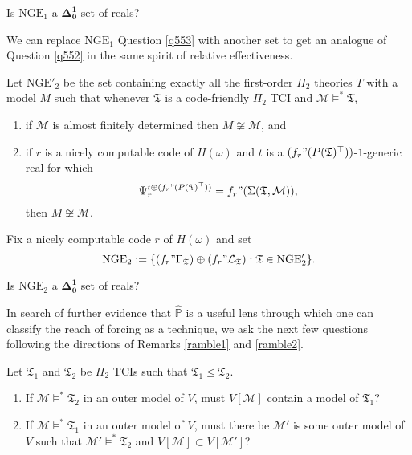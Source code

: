 \documentclass[12pt]{article}
\numberwithin{equation}{section}
\begin{document}
\begin{ques}\label{q553}
Is $\mathrm{NGE}_1$ a $\mathbf{\Delta^1_0}$ set of reals?
\end{ques}

We can replace $\mathrm{NGE}_1$ Question \ref{q553} with another set to get an analogue of Question \ref{q552} in the same spirit of relative effectiveness. 

Let $\mathrm{NGE}'_2$ be the set containing exactly all the first-order $\Pi_2$ theories $T$ with a model $M$ such that whenever $\mathfrak{T}$ is a code-friendly $\Pi_2$ TCI and $\mathcal{M} \models^* \mathfrak{T}$,
\begin{enumerate}[label=(\alph*)]
    \item if $\mathcal{M}$ is almost finitely determined then $M \not \cong \mathcal{M}$, and
    \item if $r$ is a nicely computable code of $H(\omega)$ and $t$ is a $(f_r" (P(\mathfrak{T})^{\top}))$-$1$-generic real for which
    \begin{equation*}
        \Psi_r^{t \oplus (f_r" (P(\mathfrak{T})^{\top}))} = f_r" (\Sigma(\mathfrak{T}, \mathcal{M})) \text{,}
    \end{equation*}
    then $M \not \cong \mathcal{M}$.
\end{enumerate}
Fix a nicely computable code $r$ of $H(\omega)$ and set
\begin{equation*}
    \mathrm{NGE}_2 := \{(f_r" \Gamma_{\mathfrak{T}}) \oplus (f_r" \mathcal{L}_{\mathfrak{T}}) : \mathfrak{T} \in \mathrm{NGE}'_2\} \text{.}
\end{equation*}

\begin{ques}
Is $\mathrm{NGE}_2$ a $\mathbf{\Delta^1_0}$ set of reals?
\end{ques}

In search of further evidence that $\hat{\mathbb{P}}$ is a useful lens through which one can classify the reach of forcing as a technique, we ask the next few questions following the directions of Remarks \ref{ramble1} and \ref{ramble2}.

\begin{ques}
Let $\mathfrak{T}_1$ and $\mathfrak{T}_2$ be $\Pi_2$ TCIs such that $\mathfrak{T}_1 \trianglelefteq \mathfrak{T}_2$.
\begin{enumerate}[label=(\arabic*)]
    \item If $\mathcal{M} \models^* \mathfrak{T}_2$ in an outer model of $V$, must $V[\mathcal{M}]$ contain a model of $\mathfrak{T}_1$?
    \item If $\mathcal{M} \models^* \mathfrak{T}_1$ in an outer model of $V$, must there be $\mathcal{M}'$ is some outer model of $V$ such that $\mathcal{M}' \models^* \mathfrak{T}_2$ and $V[\mathcal{M}] \subset V[\mathcal{M}']$?
\end{enumerate}
\end{ques}
\end{document}
